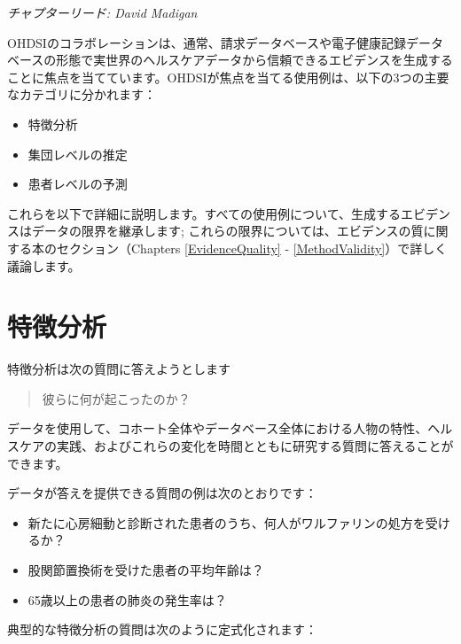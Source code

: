 \documentclass[
  11pt]{book}
\providecommand{\tightlist}{%
  \setlength{\itemsep}{0pt}\setlength{\parskip}{0pt}}
\theoremstyle{definition}
\theoremstyle{definition}
\theoremstyle{definition}
\theoremstyle{definition}
\theoremstyle{remark}
\begin{document}
\emph{チャプターリード: David Madigan}

OHDSIのコラボレーションは、通常、請求データベースや電子健康記録データベースの形態で実世界のヘルスケアデータから信頼できるエビデンスを生成することに焦点を当てています。OHDSIが焦点を当てる使用例は、以下の3つの主要なカテゴリに分かれます：

\begin{itemize}
\tightlist
\item
  特徴分析
\item
  集団レベルの推定
\item
  患者レベルの予測
\end{itemize}

これらを以下で詳細に説明します。すべての使用例について、生成するエビデンスはデータの限界を継承します; これらの限界については、エビデンスの質に関する本のセクション（Chapters \ref{EvidenceQuality} - \ref{MethodValidity}）で詳しく議論します。

\section{特徴分析}\label{ux7279ux5fb4ux5206ux6790}


特徴分析は次の質問に答えようとします

\begin{quote}
彼らに何が起こったのか？
\end{quote}

データを使用して、コホート全体やデータベース全体における人物の特性、ヘルスケアの実践、およびこれらの変化を時間とともに研究する質問に答えることができます。

データが答えを提供できる質問の例は次のとおりです：

\begin{itemize}
\tightlist
\item
  新たに心房細動と診断された患者のうち、何人がワルファリンの処方を受けるか？
\item
  股関節置換術を受けた患者の平均年齢は？
\item
  65歳以上の患者の肺炎の発生率は？
\end{itemize}

典型的な特徴分析の質問は次のように定式化されます：
\end{document}
